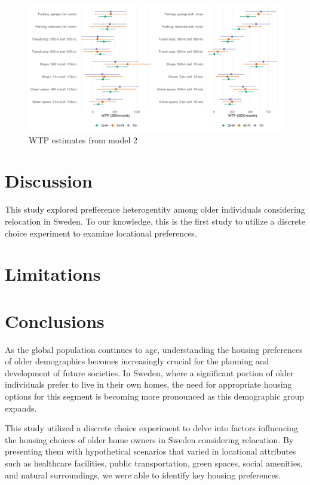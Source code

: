 \documentclass[3p,11pt ]{elsarticle}
\begin{document}
\begin{figure}[H]
\centering
\includegraphics[scale=0.40]{figures/wtp_combined_side_by_side.png}
\caption{WTP estimates from model 2 \label{fig:wtp}}
\end{figure}





\section{Discussion}

This study explored prefference heterogentity among older individuals considering relocation in Sweden.
To our knowledge, 
this is the first study to utilize a discrete choice experiment to examine locational preferences.

\section{Limitations}



\section{Conclusions}

As the global population continues to age, understanding the housing preferences of older demographics becomes increasingly crucial for the planning and development of future societies. In Sweden, where a significant portion of older individuals prefer to live in their own homes, the need for appropriate housing options for this segment is becoming more pronounced as this demographic group expands. 

This study utilized a discrete choice experiment to delve into factors influencing the housing choices of older home owners in Sweden considering relocation.
By presenting them with hypothetical scenarios that varied in locational attributes such as healthcare facilities, public transportation, green spaces, social amenities, and natural surroundings, we were able to identify key housing preferences.
\end{document}
